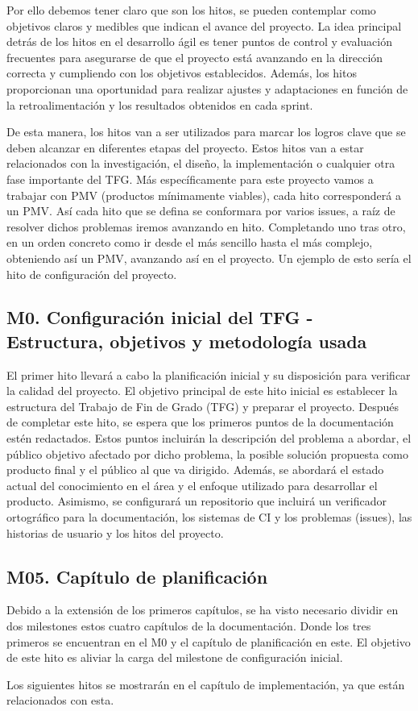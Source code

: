 Por ello debemos tener claro que son los hitos, se pueden contemplar como objetivos claros y medibles que indican el avance del proyecto. La idea principal detrás de los hitos en el desarrollo ágil es tener puntos de control y evaluación frecuentes para asegurarse de que el proyecto está avanzando en la dirección correcta y cumpliendo con los objetivos establecidos. Además, los hitos proporcionan una oportunidad para realizar ajustes y adaptaciones en función de la retroalimentación y los resultados obtenidos en cada sprint. 

De esta manera, los hitos van a ser utilizados para marcar los logros clave que se deben alcanzar en diferentes etapas del proyecto. Estos hitos van a estar relacionados con la investigación, el diseño, la implementación o cualquier otra fase importante del TFG. Más específicamente para este proyecto vamos a trabajar con PMV (productos mínimamente viables), cada hito corresponderá a un PMV. Así cada hito que se defina se conformara por varios issues, a raíz de resolver dichos problemas iremos avanzando en hito. Completando uno tras otro, en un orden concreto como ir desde el más sencillo hasta el más complejo, obteniendo así un PMV, avanzando así en el proyecto. Un ejemplo de esto sería el hito de configuración del proyecto.

\subsection{M0. Configuración inicial del TFG - Estructura, objetivos y metodología usada}
El primer hito llevará a cabo la planificación inicial y su disposición para verificar la calidad del
proyecto.
El objetivo principal de este hito inicial es establecer la estructura del Trabajo de Fin de Grado (TFG) y preparar el proyecto. Después de completar este hito, se espera que los primeros puntos de la documentación estén redactados. Estos puntos incluirán la descripción del problema a abordar, el público objetivo afectado por dicho problema, la posible solución propuesta como producto final y el público al que va dirigido. Además, se abordará el estado actual del conocimiento en el área y el enfoque utilizado para desarrollar el producto. Asimismo, se configurará un repositorio que incluirá un verificador ortográfico para la documentación, los sistemas de CI y los problemas (issues), las historias de usuario y los hitos del proyecto.

\subsection{M05. Capítulo de planificación}
Debido a la extensión de los primeros capítulos, se ha visto necesario dividir en dos milestones estos cuatro capítulos de la documentación. Donde los tres primeros se encuentran en el M0 y el capítulo de planificación en este.
El objetivo de este hito es aliviar la carga del milestone de configuración inicial.\vspace{0.5cm}

Los siguientes hitos se mostrarán en el capítulo de implementación, ya que están relacionados con esta.







